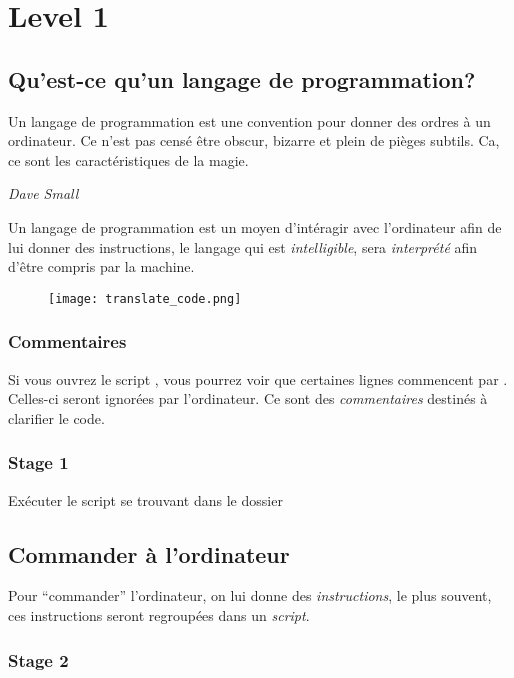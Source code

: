 \chapter{Level 1}


\section{Qu’est-ce qu’un langage de programmation?}

\epigraph{Un langage de programmation est une convention pour donner des ordres à un ordinateur. Ce n’est pas censé être obscur, bizarre et plein de pièges subtils.
Ca, ce sont les caractéristiques de la magie.}{\textit{Dave Small}}

Un langage de programmation est un moyen d’intéragir avec l’ordinateur afin de lui donner des instructions, le langage qui est \emph{intelligible}, 
sera \emph{interprété} afin d’être compris par la machine.

\begin{figure}[ht]
\centering
\texttt{[image: translate\_code.png]} 
\end{figure}

\subsection{Commentaires}

Si vous ouvrez le script , vous pourrez voir que certaines lignes commencent par \codeintext{\#}. Celles-ci seront ignorées par l'ordinateur. Ce sont des \emph{commentaires} destinés à clarifier le code.

\subsection{Stage 1}
 
Exécuter le script se trouvant dans le dossier 

\section{Commander à l'ordinateur}

Pour ``commander'' l’ordinateur, on lui donne des \emph{instructions}, le plus souvent, ces instructions seront regroupées dans un \emph{script}.

\subsection{Stage 2}

